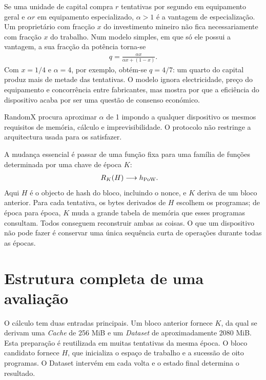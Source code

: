 Se uma unidade de capital compra \(r\) tentativas por segundo em equipamento
geral e \(\alpha r\) em equipamento especializado, \(\alpha>1\) é a vantagem
de especialização. Um proprietário com fracção \(x\) do investimento mineiro
não fica necessariamente com fracção \(x\) do trabalho. Num modelo simples,
em que só ele possui a vantagem, a sua fracção da potência torna-se
\begin{align}
 q=\frac{\alpha x}{\alpha x+(1-x)}.
 \label{eq:randomx-specialization-share}
\end{align}
Com \(x=1/4\) e \(\alpha=4\), por exemplo, obtém-se \(q=4/7\): um quarto do
capital produz mais de metade das tentativas. O modelo ignora electricidade,
preço do equipamento e concorrência entre fabricantes, mas mostra por que a
eficiência do dispositivo acaba por ser uma questão de consenso económico.

RandomX procura aproximar \(\alpha\) de 1 impondo a qualquer dispositivo os
mesmos requisitos de memória, cálculo e imprevisibilidade. O protocolo não
restringe a arquitectura usada para os satisfazer.

A mudança essencial é passar de uma função fixa para uma família de funções
determinada por uma chave de época \(K\):
\begin{align}
 R_K(H)&\longrightarrow h_{\rm PoW}.
 \label{eq:randomx-keyed-family}
\end{align}
Aqui \(H\) é o objecto de hash do bloco, incluindo o nonce, e \(K\) deriva de
um bloco anterior. Para cada tentativa, os bytes derivados de \(H\) escolhem
os programas; de época para época, \(K\) muda a grande tabela de memória que
esses programas consultam. Todos conseguem reconstruir ambas as coisas. O que
um dispositivo não pode fazer é conservar uma única sequência curta de
operações durante todas as épocas.


\section{Estrutura completa de uma avaliação}
\label{sec:randomx-map}

O cálculo tem duas entradas principais. Um bloco anterior fornece \(K\), da
qual se derivam uma \emph{Cache} de 256 MiB e um \emph{Dataset} de
aproximadamente 2080 MiB. Esta preparação é reutilizada em muitas tentativas
da mesma época. O bloco candidato fornece \(H\), que inicializa o espaço de
trabalho e a sucessão de oito programas. O Dataset intervém em cada volta e o
estado final determina o resultado.

